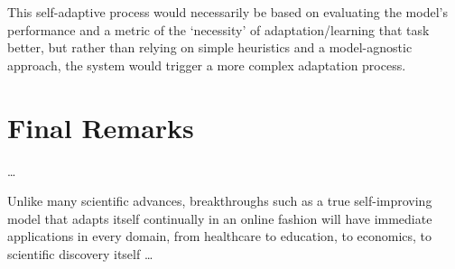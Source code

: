\documentclass[../main.tex]{subfiles}
\begin{document}
    This self-adaptive process would necessarily be based on evaluating the model's performance and a metric of the `necessity' of adaptation/learning that task better, but rather than relying on simple heuristics and a model-agnostic approach, the system would trigger a more complex adaptation process.

    \clearpage
  


    



    \section{Final Remarks} \label{conclusions:final_remarks} 
    
    \dots

    Unlike many scientific advances, breakthroughs such as a true self-improving model that adapts itself continually in an online fashion will have immediate applications in every domain, from healthcare to education, to economics, to scientific discovery itself \dots 

\end{document}
